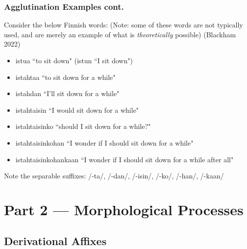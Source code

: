 \documentclass{beamer}
\begin{document}
\begin{frame}
	\frametitle{Agglutination Examples cont.}

    Consider the below Finnish words: (Note: some of these words are not typically used, and are merely an example of what is \textit{theoretically} possible) (Blackham 2022)
 
    \begin{itemize}
        \item istua ``to sit down" (istun ``I sit down")
        \item istahtaa ``to sit down for a while"
        \item istahdan ``I'll sit down for a while"
        \item istahtaisin ``I would sit down for a while"
        \item istahtaisinko ``should I sit down for a while?"
        \item istahtaisinkohan ``I wonder if I should sit down for a while"
        \item istahtaisinkohankaan ``I wonder if I should sit down for a while after all"
    \end{itemize}
    
    Note the separable suffixes: /-ta/, /-dan/, /-isin/, /-ko/, /-han/, /-kaan/
\end{frame}



\section{Part 2 --- Morphological Processes}

\subsection{Derivational Affixes}
\end{document}
